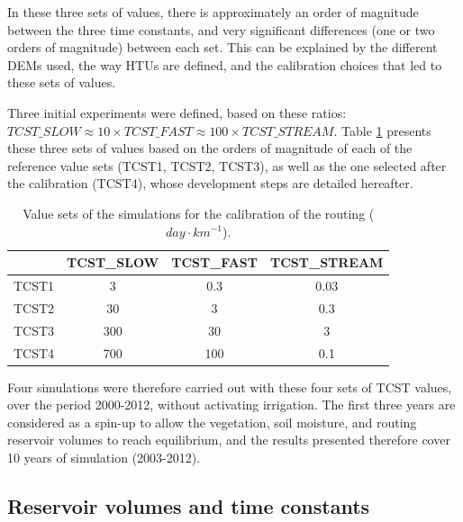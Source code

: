 In these three sets of values, there is approximately an order of magnitude between the three time constants, and very significant differences (one or two orders of magnitude) between each set. 
This can be explained by the different DEMs used, the way HTUs are defined, and the calibration choices that led to these sets of values.%

Three initial experiments were defined, based on these ratios:\\$TCST\_SLOW \approx 10 \times TCST\_FAST \approx 100 \times TCST\_STREAM$.
Table \ref{table:tcst_exp} presents these three sets of values based on the orders of magnitude of each of the reference value sets (TCST1, TCST2, TCST3), as well as the one selected after the calibration (TCST4), whose development steps are detailed hereafter.

\begin{table}[h]
\centering
\begin{tabular}{|l|c|c|c|}
\hline
\textbf{} & \textbf{TCST\_SLOW} & \textbf{TCST\_FAST} & \textbf{TCST\_STREAM} \\ \hline
TCST1 & 3 & 0.3 & 0.03 \\ \hline
TCST2 & 30 & 3 & 0.3 \\ \hline
TCST3 & 300 & 30 & 3 \\ \hline
TCST4 & 700 & 100 & 0.1 \\ \hline
\end{tabular}
\caption{Value sets of the simulations for the calibration of the \native routing ($day \cdot km^{-1}$).}
\label{table:tcst_exp}
\end{table}

Four simulations were therefore carried out with these four sets of TCST values, over the period 2000-2012, without activating irrigation.
The first three years are considered as a spin-up to allow the vegetation, soil moisture, and routing reservoir volumes to reach equilibrium, and the results presented therefore cover 10 years of simulation (2003-2012). %

\subsection{Reservoir volumes and time constants}

